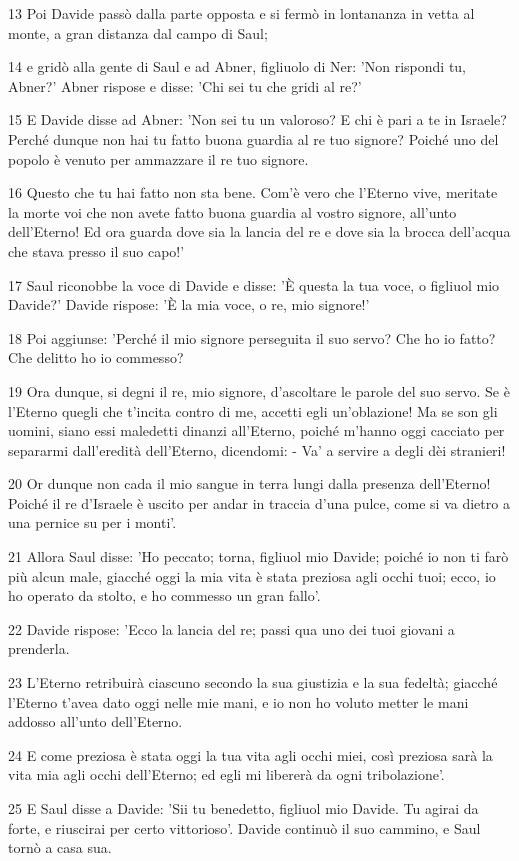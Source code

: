 \par 13 Poi Davide passò dalla parte opposta e si fermò in lontananza in vetta al monte, a gran distanza dal campo di Saul;
\par 14 e gridò alla gente di Saul e ad Abner, figliuolo di Ner: 'Non rispondi tu, Abner?' Abner rispose e disse: 'Chi sei tu che gridi al re?'
\par 15 E Davide disse ad Abner: 'Non sei tu un valoroso? E chi è pari a te in Israele? Perché dunque non hai tu fatto buona guardia al re tuo signore? Poiché uno del popolo è venuto per ammazzare il re tuo signore.
\par 16 Questo che tu hai fatto non sta bene. Com'è vero che l'Eterno vive, meritate la morte voi che non avete fatto buona guardia al vostro signore, all'unto dell'Eterno! Ed ora guarda dove sia la lancia del re e dove sia la brocca dell'acqua che stava presso il suo capo!'
\par 17 Saul riconobbe la voce di Davide e disse: 'È questa la tua voce, o figliuol mio Davide?' Davide rispose: 'È la mia voce, o re, mio signore!'
\par 18 Poi aggiunse: 'Perché il mio signore perseguita il suo servo? Che ho io fatto? Che delitto ho io commesso?
\par 19 Ora dunque, si degni il re, mio signore, d'ascoltare le parole del suo servo. Se è l'Eterno quegli che t'incita contro di me, accetti egli un'oblazione! Ma se son gli uomini, siano essi maledetti dinanzi all'Eterno, poiché m'hanno oggi cacciato per separarmi dall'eredità dell'Eterno, dicendomi: - Va' a servire a degli dèi stranieri!
\par 20 Or dunque non cada il mio sangue in terra lungi dalla presenza dell'Eterno! Poiché il re d'Israele è uscito per andar in traccia d'una pulce, come si va dietro a una pernice su per i monti'.
\par 21 Allora Saul disse: 'Ho peccato; torna, figliuol mio Davide; poiché io non ti farò più alcun male, giacché oggi la mia vita è stata preziosa agli occhi tuoi; ecco, io ho operato da stolto, e ho commesso un gran fallo'.
\par 22 Davide rispose: 'Ecco la lancia del re; passi qua uno dei tuoi giovani a prenderla.
\par 23 L'Eterno retribuirà ciascuno secondo la sua giustizia e la sua fedeltà; giacché l'Eterno t'avea dato oggi nelle mie mani, e io non ho voluto metter le mani addosso all'unto dell'Eterno.
\par 24 E come preziosa è stata oggi la tua vita agli occhi miei, così preziosa sarà la vita mia agli occhi dell'Eterno; ed egli mi libererà da ogni tribolazione'.
\par 25 E Saul disse a Davide: 'Sii tu benedetto, figliuol mio Davide. Tu agirai da forte, e riuscirai per certo vittorioso'. Davide continuò il suo cammino, e Saul tornò a casa sua.

